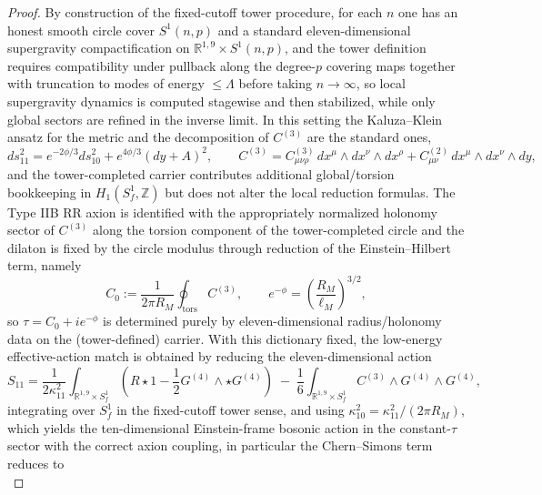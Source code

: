 \documentclass[10pt,a4paper]{amsart}
\begin{document}
\begin{proof}
By construction of the fixed-cutoff tower procedure, for each $n$ one has an honest smooth circle cover $S^{1}(n,p)$ and a standard eleven-dimensional supergravity compactification on $\mathbb{R}^{1,9}\times S^{1}(n,p)$, and the tower definition requires compatibility under pullback along the degree-$p$ covering maps together with truncation to modes of energy $\le\Lambda$ before taking $n\to\infty$, so local supergravity dynamics is computed stagewise and then stabilized, while only global sectors are refined in the inverse limit. In this setting the Kaluza--Klein ansatz for the metric and the decomposition of $C^{(3)}$ are the standard ones,
\begin{equation}\label{eq:KK_ansatz}
ds^{2}_{11}=e^{-2\phi/3}ds^{2}_{10}+e^{4\phi/3}(dy+A)^2,\qquad
C^{(3)}=C^{(3)}_{\mu\nu\rho}\,dx^\mu\wedge dx^\nu\wedge dx^\rho + C^{(2)}_{\mu\nu}\,dx^\mu\wedge dx^\nu\wedge dy,
\end{equation}
and the tower-completed carrier contributes additional global/torsion bookkeeping in $H_{1}(S_f^{1},\mathbb{Z})$ but does not alter the local reduction formulas. The Type IIB RR axion is identified with the appropriately normalized holonomy sector of $C^{(3)}$ along the torsion component of the tower-completed circle and the dilaton is fixed by the circle modulus through reduction of the Einstein--Hilbert term, namely
\begin{equation}\label{eq:dictionary_C0_phi}
C_0 := \frac{1}{2\pi R_M}\oint_{\mathrm{tors}} C^{(3)},\qquad
e^{-\phi}=\left(\frac{R_M}{\ell_M}\right)^{3/2},
\end{equation}
so $\tau=C_0+i e^{-\phi}$ is determined purely by eleven-dimensional radius/holonomy data on the (tower-defined) carrier. With this dictionary fixed, the low-energy effective-action match is obtained by reducing the eleven-dimensional action
\begin{equation}\label{eq:S11_action}
S_{11}=\frac{1}{2\kappa_{11}^2}\int_{\mathbb{R}^{1,9}\times S_f^{1}}\!\!\left(R\star 1-\frac{1}{2}G^{(4)}\wedge\star G^{(4)}\right)\;-\;\frac{1}{6}\int_{\mathbb{R}^{1,9}\times S_f^{1}} C^{(3)}\wedge G^{(4)}\wedge G^{(4)},
\end{equation}
integrating over $S_f^{1}$ in the fixed-cutoff tower sense, and using $\kappa_{10}^2=\kappa_{11}^2/(2\pi R_M)$, which yields the ten-dimensional Einstein-frame bosonic action in the constant-$\tau$ sector with the correct axion coupling, in particular the Chern--Simons term reduces to
\begin{equation}\label{eq:CS_reduction}

\end{equation}
\end{proof}
\end{document}
